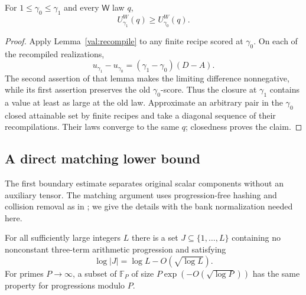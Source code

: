 \begin{proposition}[Monotonicity]
\label{prop:monotonicity}
For $1\le\gamma_0\le\gamma_1$ and every $\mathsf W$ law $q$,
\[
 U^W_{\gamma_1}(q)\ge U^W_{\gamma_0}(q).
\]
\end{proposition}

\begin{proof}
Apply Lemma~\ref{val:recompile} to any finite recipe scored at $\gamma_0$.
On each of the recompiled realizations,
\[
 u_{\gamma_1}-u_{\gamma_0}
       =(\gamma_1-\gamma_0)(D-A).
\]
The second assertion of that lemma makes the limiting difference
nonnegative, while its first assertion preserves the old $\gamma_0$-score.
Thus the closure at $\gamma_1$ contains a value at least as large at the old
law.  Approximate an arbitrary pair in the $\gamma_0$ closed attainable set
by finite recipes and take a diagonal sequence of their recompilations.
Their laws converge to the same $q$; closedness proves the claim.
\end{proof}

\subsection{A direct matching lower bound}
\label{val:matching-section}

The first boundary estimate separates original scalar components without
an auxiliary tensor.  The matching argument uses progression-free hashing
and collision removal as in \citet[Section~6]{cw}; we give the details
with the bank normalization needed here.

\begin{lemma}
\label{val:ap-set}
For all sufficiently large integers $L$ there is a set
$J\subseteq\{1,\ldots,L\}$ containing no nonconstant three-term arithmetic
progression and satisfying
\[
 \log|J|=\log L-O(\sqrt{\log L}).
\]
For primes $P\to\infty$, a subset of $\mathbb F_P$ of size
$P\exp(-O(\sqrt{\log P}))$ has the same property for progressions modulo
$P$.
\end{lemma}

